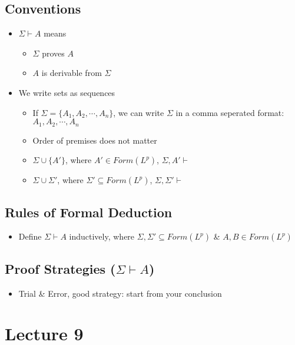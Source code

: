 \documentclass[11pt]{article}
\begin{document}
\subsection{Conventions}
\begin{itemize}
    \item $\Sigma\vdash A$ means 
    \begin{itemize}
        \item $\Sigma$ proves $A$
        \item $A$ is derivable from $\Sigma$
    \end{itemize}
    \item We write sets as sequences
    \begin{itemize}
        \item If $\Sigma = \{A_1, A_2,\cdots, A_n\}$, we can write $\Sigma$ in a comma seperated format: $A_1, A_2, \cdots, A_n$
        \item Order of premises does not matter
        \item $\Sigma \cup\{A'\}$, where $A'\in Form(L^p)$, $\Sigma, A'\vdash$
        \item $\Sigma \cup \Sigma'$, where $\Sigma' \subseteq Form(L^p)$, $\Sigma, \Sigma'\vdash$
    \end{itemize}
\end{itemize}
\subsection{Rules of Formal Deduction}
\begin{itemize}
    \item Define $\Sigma\vdash A$ inductively, where $\Sigma, \Sigma'\subseteq Form(L^p)$ \& $A,B\in Form(L^p)$
\end{itemize}
\subsection{Proof Strategies ($\Sigma\vdash A$)}
\begin{itemize}
    \item Trial \& Error, good strategy: start from your conclusion 
\end{itemize}



\section{Lecture 9}
\end{document}
